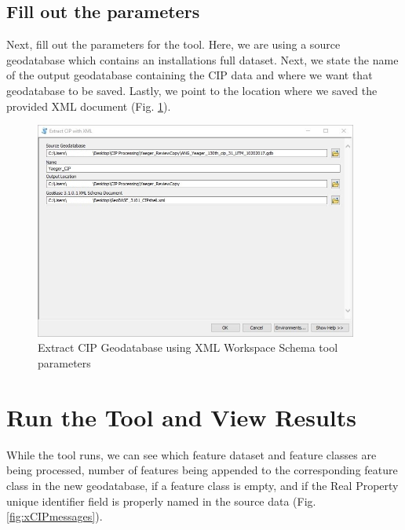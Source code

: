 \documentclass[openany]{book}
\theoremstyle{definition}
\theoremstyle{definition}
\theoremstyle{definition}
\theoremstyle{remark}
\begin{document}
\subsection{Fill out the parameters}\label{fill-out-the-parameters}

Next, fill out the parameters for the tool. Here, we are using a source
geodatabase which contains an installations full dataset. Next, we state
the name of the output geodatabase containing the CIP data and where we
want that geodatabase to be saved. Lastly, we point to the location
where we saved the provided XML document (Fig. \ref{fig:xCIPparams}).

\begin{figure}[H]

{\centering \includegraphics[width=4.19in,]{figures/xCIP-after} 

}

\caption{Extract CIP Geodatabase using XML Workspace Schema tool parameters}\label{fig:xCIPparams}
\end{figure}

\section{Run the Tool and View
Results}\label{run-the-tool-and-view-results}

While the tool runs, we can see which feature dataset and feature
classes are being processed, number of features being appended to the
corresponding feature class in the new geodatabase, if a feature class
is empty, and if the Real Property unique identifier field is properly
named in the source data (Fig. \ref{fig:xCIPmessages}).
\end{document}
